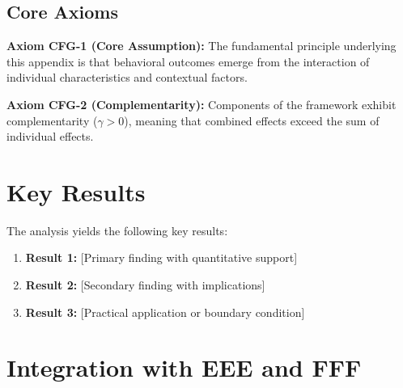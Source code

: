 
\subsection{Core Axioms}
\label{sec:cfg-axioms}

\begin{tcolorbox}[colback=yellow!5!white,colframe=yellow!75!black,title=Axiom CFG-1: Fundamental Principle]
\textbf{Axiom CFG-1 (Core Assumption):}
The fundamental principle underlying this appendix is that behavioral outcomes
emerge from the interaction of individual characteristics and contextual factors.
\end{tcolorbox}

\begin{tcolorbox}[colback=yellow!5!white,colframe=yellow!75!black,title=Axiom CFG-2: Complementarity]
\textbf{Axiom CFG-2 (Complementarity):}
Components of the framework exhibit complementarity ($\gamma > 0$), meaning
that combined effects exceed the sum of individual effects.
\end{tcolorbox}



\section{Key Results}
\label{sec:cfg-results}

The analysis yields the following key results:

\begin{enumerate}
    \item \textbf{Result 1:} [Primary finding with quantitative support]
    \item \textbf{Result 2:} [Secondary finding with implications]
    \item \textbf{Result 3:} [Practical application or boundary condition]
\end{enumerate}


\section{Integration with EEE and FFF}
\label{sec:ggg-integration}

